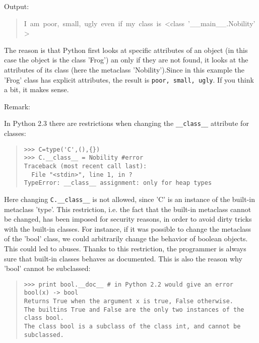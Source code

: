 \documentclass[10pt,english]{article}
\begin{document}
Output:
\begin{quote}
\begin{ttfamily}\begin{flushleft}
\mbox{I~am~poor,~small,~ugly~even~if~my~class~is~<class~'{\_}{\_}main{\_}{\_}.Nobility'>}
\end{flushleft}\end{ttfamily}
\end{quote}

The reason is that Python first looks at specific attributes of an object
(in this case the object is the class 'Frog') an only if they are not found, 
it looks at the attributes of its class (here the metaclass 'Nobility').Since 
in this example the 'Frog' class has explicit attributes, the
result is \texttt{poor, small, ugly}. If you think a bit, it makes sense.

Remark:

In Python 2.3 there are restrictions when changing the \texttt{{\_}{\_}class{\_}{\_}} 
attribute for classes:
\begin{quote}
\begin{verbatim}>>> C=type('C',(),{})
>>> C.__class__ = Nobility #error
Traceback (most recent call last):
  File "<stdin>", line 1, in ?
TypeError: __class__ assignment: only for heap types\end{verbatim}
\end{quote}

Here changing \texttt{C.{\_}{\_}class{\_}{\_}} is not allowed, since 'C' is an instance
of the built-in metaclass 'type'. This restriction, i.e. the fact that 
the built-in metaclass cannot be changed, has been imposed for
security reasons, in order to avoid dirty tricks with the built-in
classes. For instance, if it was possible to change the metaclass
of the 'bool' class, we could arbitrarily change the behavior of
boolean objects. This could led to abuses. 
Thanks to this restriction,
the programmer is always sure that built-in classes behaves as documented.
This is also the reason why 'bool' cannot be subclassed:
\begin{quote}
\begin{verbatim}>>> print bool.__doc__ # in Python 2.2 would give an error
bool(x) -> bool
Returns True when the argument x is true, False otherwise.
The builtins True and False are the only two instances of the class bool.
The class bool is a subclass of the class int, and cannot be subclassed.\end{verbatim}
\end{quote}
\end{document}
